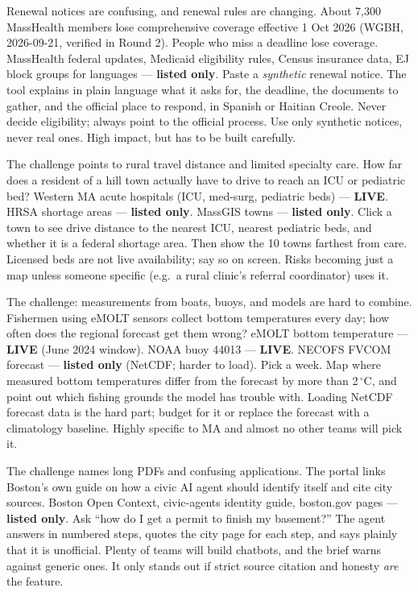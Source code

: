 \documentclass[11pt]{article}
\newcommand{\LIVE}{\textcolor{okgreen}{\textbf{LIVE}}}
\newcommand{\LISTED}{\textcolor{greyish}{\textbf{listed only}}}
\begin{document}
{Renewal notices are confusing, and renewal rules are changing. About 7,300 MassHealth
members lose comprehensive coverage effective 1 Oct 2026 (WGBH, 2026-09-21, verified in
Round 2). People who miss a deadline lose coverage.}
{MassHealth federal updates, Medicaid eligibility rules, Census insurance data, EJ block groups for languages --- \LISTED.}
{Paste a \emph{synthetic} renewal notice. The tool explains in plain language what it asks
for, the deadline, the documents to gather, and the official place to respond, in Spanish
or Haitian Creole.}
{Never decide eligibility; always point to the official process. Use only synthetic notices,
never real ones. High impact, but has to be built carefully.}

{The challenge points to rural travel distance and limited specialty care. How far does a
resident of a hill town actually have to drive to reach an ICU or pediatric bed?}
{Western MA acute hospitals (ICU, med-surg, pediatric beds) --- \LIVE. HRSA shortage areas --- \LISTED. MassGIS towns --- \LISTED.}
{Click a town to see drive distance to the nearest ICU, nearest pediatric beds, and whether
it is a federal shortage area. Then show the 10 towns farthest from care.}
{Licensed beds are not live availability; say so on screen. Risks becoming just a map
unless someone specific (e.g.\ a rural clinic's referral coordinator) uses it.}

{The challenge: measurements from boats, buoys, and models are hard to combine. Fishermen
using eMOLT sensors collect bottom temperatures every day; how often does the regional
forecast get them wrong?}
{eMOLT bottom temperature --- \LIVE{} (June 2024 window). NOAA buoy 44013 --- \LIVE. NECOFS FVCOM forecast --- \LISTED{} (NetCDF; harder to load).}
{Pick a week. Map where measured bottom temperatures differ from the forecast by more than
2\,$^\circ$C, and point out which fishing grounds the model has trouble with.}
{Loading NetCDF forecast data is the hard part; budget for it or replace the forecast with
a climatology baseline. Highly specific to MA and almost no other teams will pick it.}

{The challenge names long PDFs and confusing applications. The portal links Boston's own
guide on how a civic AI agent should identify itself and cite city sources.}
{Boston Open Context, civic-agents identity guide, boston.gov pages --- \LISTED.}
{Ask ``how do I get a permit to finish my basement?'' The agent answers in numbered steps,
quotes the city page for each step, and says plainly that it is unofficial.}
{Plenty of teams will build chatbots, and the brief warns against generic ones. It only
stands out if strict source citation and honesty \emph{are} the feature.}
\end{document}
